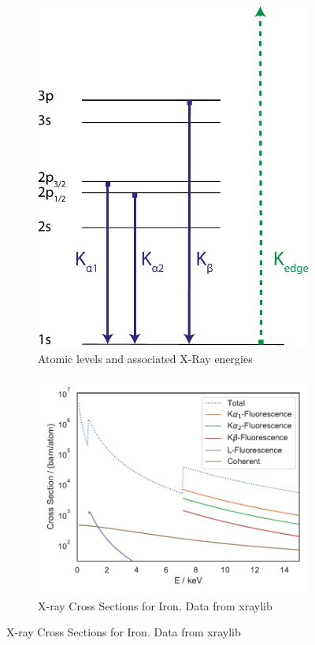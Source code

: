 \begin{figure}[h]
	\centering
	\begin{subfigure}[b]{0.35\textwidth}
		\includegraphics[width=\linewidth]{images/levels.pdf}
		\caption[Atomic Levels]{Atomic levels and associated X\nobreakdash-Ray energies}
		\label{fig:levels}
	\end{subfigure}
	\begin{subfigure}[b]{0.45\textwidth}
		\includegraphics[width=\linewidth]{images/crosssectionFe.pdf}
		\caption[Cross Sections]{X-ray Cross Sections for Iron. Data from xraylib \cite{xraylib}}
		\label{fig:cross}
	\end{subfigure}
\end{figure}

